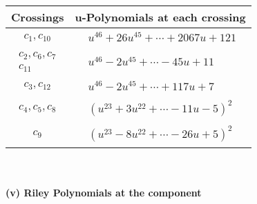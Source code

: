 \documentclass[1p]{elsarticle_modified}
\theoremstyle{definition}
\begin{document}
\begin{tabular}{m{50pt}|m{274pt}}
Crossings & \hspace{64pt}u-Polynomials at each crossing \\
\hline $$\begin{aligned}c_{1},c_{10}\end{aligned}$$&$\begin{aligned}
&u^{46}+26 u^{45}+\cdots+2067 u+121
\end{aligned}$\\
\hline $$\begin{aligned}c_{2},c_{6},c_{7}\\c_{11}\end{aligned}$$&$\begin{aligned}
&u^{46}-2 u^{45}+\cdots-45 u+11
\end{aligned}$\\
\hline $$\begin{aligned}c_{3},c_{12}\end{aligned}$$&$\begin{aligned}
&u^{46}-2 u^{45}+\cdots+117 u+7
\end{aligned}$\\
\hline $$\begin{aligned}c_{4},c_{5},c_{8}\end{aligned}$$&$\begin{aligned}
&(u^{23}+3 u^{22}+\cdots-11 u-5)^{2}
\end{aligned}$\\
\hline $$\begin{aligned}c_{9}\end{aligned}$$&$\begin{aligned}
&(u^{23}-8 u^{22}+\cdots-26 u+5)^{2}
\end{aligned}$\\
\hline
\end{tabular}\\~\\
\newpage\renewcommand{\arraystretch}{1}
\flushleft \textbf{(v) Riley Polynomials at the component}\newline \\
\end{document}
